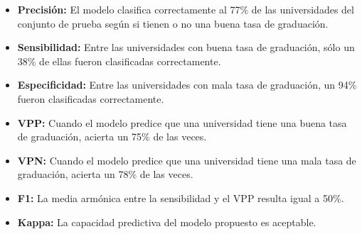 \documentclass[
  letterpaper,
  DIV=11,
  numbers=noendperiod]{scrartcl}
\providecommand{\tightlist}{%
  \setlength{\itemsep}{0pt}\setlength{\parskip}{0pt}}\usepackage{longtable,booktabs,array}
\begin{document}
\begin{itemize}
\tightlist
\item
  \textbf{Precisión:} El modelo clasifica correctamente al 77\% de las
  universidades del conjunto de prueba según si tienen o no una buena
  tasa de graduación.
\item
  \textbf{Sensibilidad:} Entre las universidades con buena tasa de
  graduación, sólo un 38\% de ellas fueron clasificadas correctamente.
\item
  \textbf{Especificidad:} Entre las universidades con mala tasa de
  graduación, un 94\% fueron clasificadas correctamente.
\item
  \textbf{VPP:} Cuando el modelo predice que una universidad tiene una
  buena tasa de graduación, acierta un 75\% de las veces.
\item
  \textbf{VPN:} Cuando el modelo predice que una universidad tiene una
  mala tasa de graduación, acierta un 78\% de las veces.
\item
  \textbf{F1:} La media armónica entre la sensibilidad y el VPP resulta
  igual a 50\%.
\item
  \textbf{Kappa:} La capacidad predictiva del modelo propuesto es
  aceptable.
\end{itemize}
\end{document}
